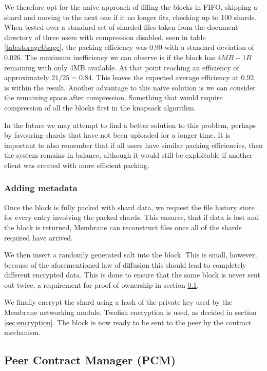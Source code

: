 \documentclass[11pt, a4paper, twocolumn, twoside]{report}
\begin{document}
We therefore opt for the naive approach of filling the blocks in FIFO, skipping a shard and moving to the next one if it no longer fits, checking up to 100 shards. When tested over a standard set of sharded files taken from the document directory of three users with compression disabled, seen in table \ref{tab:storageUsage}, the packing efficiency was $0.90$ with a standard deviation of $0.026$. The maximum inefficiency we can observe is if the block has $4MB - 1B$ remaining with only 4MB available. At that point reaching an efficiency of approximately $21/25 = 0.84$. This leaves the expected average efficiency at $0.92$, is within the result. Another advantage to this naive solution is we can consider the remaining space after compression. Something that would require compression of all the blocks first in the knapsack algorithm.

In the future we may attempt to find a better solution to this problem, perhaps by favouring shards that have not been uploaded for a longer time. It is important to also remember that if all users have similar packing efficiencies, then the system remains in balance, although it would still be exploitable if another client was created with more efficient packing.

\subsubsection{Adding metadata}

Once the block is fully packed with shard data, we request the file history store for every entry involving the packed shards. This ensures, that if data is lost and the block is returned, Membrane can reconstruct files once all of the shards required have arrived.

We then insert a randomly generated salt into the block. This is small, however, because of the aforementioned law of diffusion \citep{shannon1945mathematical} this should lead to completely different encrypted data. This is done to ensure that the same block is never sent out twice, a requirement for proof of ownership in section \ref{sec:contractMech}.

We finally encrypt the shard using a hash of the private key used by the Membrane networking module. Twofish encryption is used, as decided in section \ref{sec:encryption}. The block is now ready to be sent to the peer by the contract mechanism.


\subsection{Peer Contract Manager (PCM)} \label{sec:contractMech}
\end{document}
